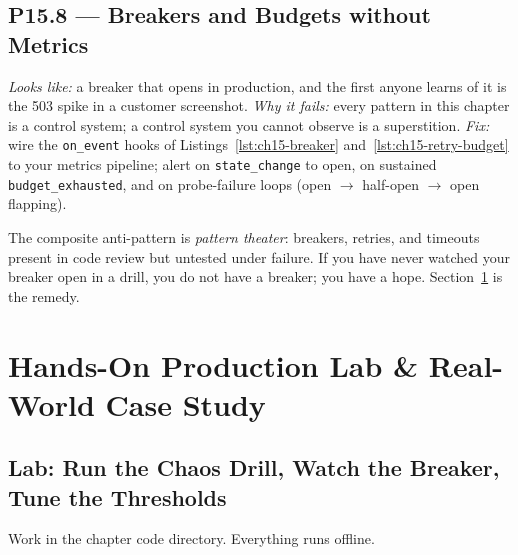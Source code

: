 \subsection*{P15.8 --- Breakers and Budgets without Metrics}
\emph{Looks like:} a breaker that opens in production, and the first
anyone learns of it is the 503 spike in a customer screenshot.
\emph{Why it fails:} every pattern in this chapter is a control system; a
control system you cannot observe is a superstition. \emph{Fix:} wire the
\texttt{on\_event} hooks of Listings~\ref{lst:ch15-breaker}
and~\ref{lst:ch15-retry-budget} to your metrics pipeline; alert on
\texttt{state\_change} to open, on sustained \texttt{budget\_exhausted},
and on probe-failure loops (open $\to$ half-open $\to$ open flapping).

\begin{warningbox}
The composite anti-pattern is \emph{pattern theater}: breakers, retries,
and timeouts present in code review but untested under failure. If you have
never watched your breaker open in a drill, you do not have a breaker; you
have a hope. Section~\ref{sec:ch15-lab} is the remedy.
\end{warningbox}

\section{Hands-On Production Lab \& Real-World Case Study}
\label{sec:ch15-lab}

\subsection*{Lab: Run the Chaos Drill, Watch the Breaker, Tune the Thresholds}

Work in the chapter code directory. Everything runs offline.


